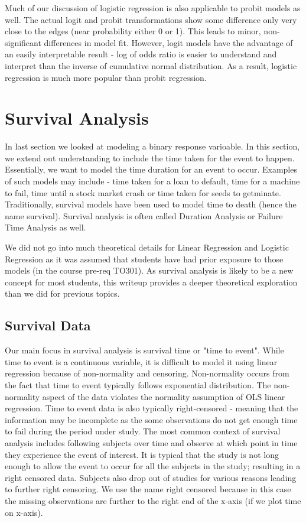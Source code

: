 \documentclass[11pt, letterpaper, twoside]{memoir}\usepackage{knitr}
\newlength\drop
\begin{document}
Much of our discussion of logistic regression is also applicable to probit models as well. The actual logit and probit transformations show some difference only very close to the edges (near probability either 0 or 1). This leads to minor, non-significant differences in model fit.  However, logit models have the advantage of an easily interpretable result - log of odds ratio is easier to understand and interpret than the inverse of cumulative normal distribution. As a result, logistic regression is much more popular than probit regression.  

\section{Survival Analysis}

In last section we looked at modeling a binary response varioable. In this section, we extend out understanding to include the time taken for the event to happen. Essentially, we want to model the time duration for an event to occur. Examples of such models may include - time taken for a loan to default, time for a machine to fail, time until a stock market crash or time taken for seeds to getminate. Traditionally, survival models have been used to model time to death (hence the name survival). Survival analysis is often called Duration Analysis or Failure Time Analysis as well.

We did not go into much theoretical details for Linear Regression and Logistic Regression as it was assumed that students have had prior exposure to those models (in the course pre-req TO301). As survival analysis is likely to be a new concept for most students, this writeup provides a deeper theoretical exploration than we did for previous topics.

\subsection{Survival Data}

Our main focus in survival analysis is survival time or "time to event". While time to event is a continuous variable, it is difficult to model it using linear regression because of non-normality and censoring. Non-normality occurs from the fact that time to event typically follows exponential distribution. The non-normality aspect of the data violates the normality assumption of OLS linear regression.  Time to event data is also typically right-censored - meaning that the information may be incomplete as the some observations do not get enough time to fail during the period under study. The most common context of survival analysis includes following subjects over time and observe at which point in time they experience the event of interest. It is typical that the study is not long enough to allow the event to occur for all the subjects in the study; resulting in a right censored data. Subjects also drop out of studies for various reasons leading to further right censoring. We use the name right censored because in this case the missing observations are further to the right end of the x-axis (if we plot time on x-axis).
\end{document}
